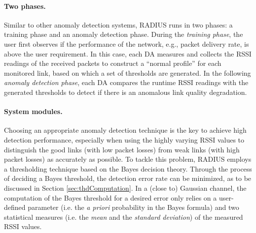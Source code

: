 \paragraph{Two phases.} Similar to other anomaly detection systems, RADIUS runs in two phases: a training phase and an anomaly detection phase. During the \emph{training phase}, the user first observes if the performance of the network, e.g., packet delivery rate, is above the user requirement. In this case, each DA measures and collects the RSSI readings of the received packets to construct a ``normal profile'' for each monitored link, based on which a set of thresholds are generated. In the following \emph{anomaly detection phase}, each DA compares the runtime RSSI readings with the generated thresholds to detect if there is an anomalous link quality degradation. 




\paragraph{System modules.} Choosing an appropriate anomaly detection technique is the key to achieve high detection performance, especially when using the highly varying RSSI values to distinguish the good links (with low packet losses) from weak links (with high packet losses) as accurately as possible. To tackle this problem,  RADIUS employs a thresholding technique based on the Bayes decision theory. 
Through the process of deciding a Bayes threshold, the detection error rate
can be minimized, as to be discussed in Section \ref{sec:thdComputation}. In a (close to) Gaussian channel, the computation of the Bayes threshold for a desired error only relies on a user-defined parameter (i.e. the \textit{a priori} probability in the Bayes formula) and two statistical measures (i.e. the {\em mean} and the {\em standard deviation}) of the measured RSSI values. 

